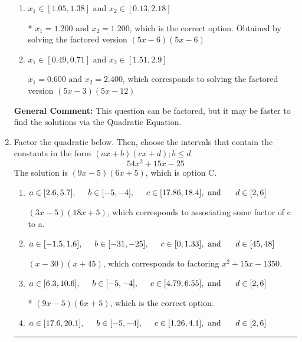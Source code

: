 \documentclass{extbook}[14pt]
\newcommand{\litem}[1]{\item #1

\rule{\textwidth}{0.4pt}}
\begin{document}
\begin{enumerate}
{\begin{enumerate}[label=\Alph*.]
$x_1 = 0.240 \text{ and } x_2 = 6.000$, which corresponds to solving the factored version $(25x -6)(x -6)$
\item \( x_1 \in [1.05, 1.38] \text{ and } x_2 \in [0.13, 2.18] \)

* $x_1 = 1.200 \text{ and } x_2 = 1.200$, which is the correct option. Obtained by solving the factored version $(5x -6)(5x -6)$
\item \( x_1 \in [0.49, 0.71] \text{ and } x_2 \in [1.51, 2.9] \)

$x_1 = 0.600 \text{ and } x_2 = 2.400$, which corresponds to solving the factored version $(5x -3)(5x -12)$
\end{enumerate}

\textbf{General Comment:} This question can be factored, but it may be faster to find the solutions via the Quadratic Equation.
}
\litem{
Factor the quadratic below. Then, choose the intervals that contain the constants in the form $(ax+b)(cx+d); b \leq d.$
\[ 54x^{2} +15 x -25 \]The solution is \( (9x -5)(6x + 5) \), which is option C.\begin{enumerate}[label=\Alph*.]
\item \( a \in [2.6, 5.7], \hspace*{5mm} b \in [-5, -4], \hspace*{5mm} c \in [17.86, 18.4], \text{ and } \hspace*{5mm} d \in [2, 6] \)

 $(3x -5)(18x + 5)$, which corresponds to associating some factor of c to a.
\item \( a \in [-1.5, 1.6], \hspace*{5mm} b \in [-31, -25], \hspace*{5mm} c \in [0, 1.33], \text{ and } \hspace*{5mm} d \in [45, 48] \)

 $(x -30)(x + 45)$, which corresponds to factoring $x^{2} +15 x -1350$.
\item \( a \in [6.3, 10.6], \hspace*{5mm} b \in [-5, -4], \hspace*{5mm} c \in [4.79, 6.55], \text{ and } \hspace*{5mm} d \in [2, 6] \)

* $(9x -5)(6x + 5)$, which is the correct option.
\item \( a \in [17.6, 20.1], \hspace*{5mm} b \in [-5, -4], \hspace*{5mm} c \in [1.26, 4.1], \text{ and } \hspace*{5mm} d \in [2, 6] \)


\end{enumerate}}
\end{enumerate}
\end{document}
